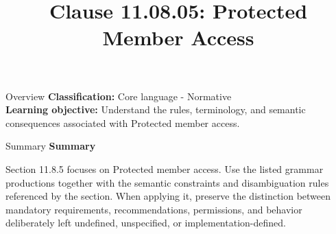 \documentclass[10pt,letterpaper]{article}
\title{Clause 11.08.05: Protected Member Access}
\author{}
\date{}
\begin{document}
\maketitle
\begin{CornellOverviewBox}{Overview}
\textbf{Classification:} Core language - Normative\\[2pt]
\textbf{Learning objective:} Understand the rules, terminology, and semantic consequences associated with Protected member access.
\end{CornellOverviewBox}\begin{CornellSummaryBox}{Summary}
{\sffamily\bfseries\color{Accent} Summary}\par\vspace{3pt}Section 11.8.5 focuses on Protected member access. Use the listed grammar productions together with the semantic constraints and disambiguation rules referenced by the section. When applying it, preserve the distinction between mandatory requirements, recommendations, permissions, and behavior deliberately left undefined, unspecified, or implementation-defined.
\end{CornellSummaryBox}
\end{document}
